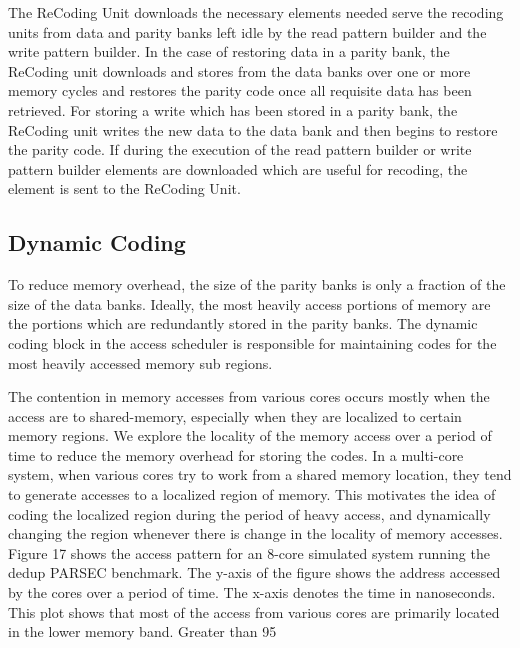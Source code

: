 The ReCoding Unit downloads the necessary elements needed serve the recoding units from data and parity banks left idle by the read pattern builder and the write pattern builder. In the case of restoring data in a parity bank, the ReCoding unit downloads and stores from the data banks over one or more memory cycles and restores the parity code once all requisite data has been retrieved. For storing a write which has been stored in a parity bank, the ReCoding unit writes the new data to the data bank and then begins to restore the parity code. If during the execution of the read pattern builder or write pattern builder elements are downloaded which are useful for recoding, the element is sent to the ReCoding Unit.


\subsection{Dynamic Coding}
\label{sec:dynamicCoding}
To reduce memory overhead, the size of the parity banks is only a fraction of the size of the data banks. Ideally, the most heavily access portions of memory are the portions which are redundantly stored in the parity banks. The dynamic coding block in the access scheduler is responsible for maintaining codes for the most heavily accessed memory sub regions.

The contention in memory accesses from various cores occurs mostly when the access are to shared-memory, especially when they are localized to certain memory regions. We explore the locality of the memory access over a period of time to reduce the memory overhead for storing the codes. In a multi-core system, when various cores try to work from a shared memory location, they tend to generate accesses to a localized region of memory. This motivates the idea of coding the localized region during the period of heavy access, and dynamically changing the region whenever there is change in the locality of memory accesses. Figure 17 shows the access pattern for an 8-core simulated system running the dedup PARSEC benchmark. The y-axis of the figure shows the address accessed by the cores over a period of time. The x-axis denotes the time in nanoseconds. This plot shows that most of the access from various cores are primarily located in the lower memory band. Greater than 95%


